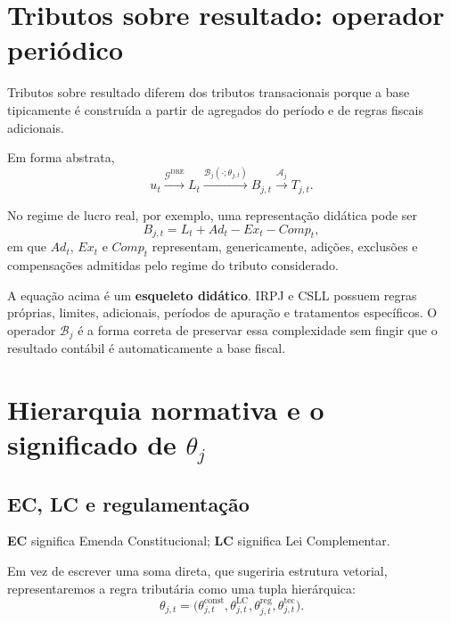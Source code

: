 \documentclass[11pt,a4paper]{article}
\newcommand{\DRE}{\mathrm{DRE}}
\newcommand{\cB}{\mathcal{B}}
\newcommand{\cG}{\mathcal{G}}
\newcommand{\cA}{\mathcal{A}}
\begin{document}
\section{Tributos sobre resultado: operador periódico}

Tributos sobre resultado diferem dos tributos transacionais porque a base tipicamente é construída a partir de agregados do período e de regras fiscais adicionais.

Em forma abstrata,
\begin{equation}
\boxed{
u_t
\xrightarrow{\cG^{\DRE}}
L_t
\xrightarrow{\cB_j(\cdot;\theta_{j,t})}
B_{j,t}
\xrightarrow{\cA_j}
T_{j,t}.}
\label{eq:result-pipeline}
\end{equation}

No regime de lucro real, por exemplo, uma representação didática pode ser
\begin{equation}
\boxed{B_{j,t}=L_t+Ad_t-Ex_t-Comp_t,}
\label{eq:lucro-real-didatico}
\end{equation}
em que $Ad_t$, $Ex_t$ e $Comp_t$ representam, genericamente, adições, exclusões e compensações admitidas pelo regime do tributo considerado.

\begin{cuidado}
A equação acima é um \textbf{esqueleto didático}. IRPJ e CSLL possuem regras próprias, limites, adicionais, períodos de apuração e tratamentos específicos. O operador $\cB_j$ é a forma correta de preservar essa complexidade sem fingir que o resultado contábil é automaticamente a base fiscal.
\end{cuidado}

\section[Hierarquia normativa e o significado de theta j]{Hierarquia normativa e o significado de $\theta_j$}

\subsection{EC, LC e regulamentação}

\textbf{EC} significa Emenda Constitucional; \textbf{LC} significa Lei Complementar.

Em vez de escrever uma soma direta, que sugeriria estrutura vetorial, representaremos a regra tributária como uma tupla hierárquica:
\begin{equation}
\boxed{
\theta_{j,t}=
\bigl(
\theta^{\mathrm{const}}_{j,t},
\theta^{\mathrm{LC}}_{j,t},
\theta^{\mathrm{reg}}_{j,t},
\theta^{\mathrm{tec}}_{j,t}
\bigr).
}
\label{eq:theta-hier}
\end{equation}
\end{document}
